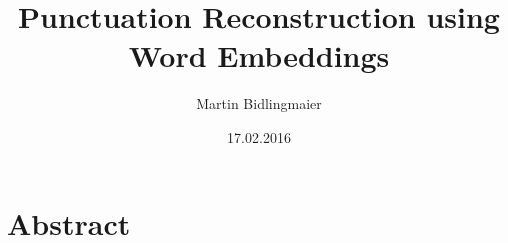 \documentclass{amsart}
\theoremstyle{plain}
\theoremstyle{definition}
\begin{document}
\title{Punctuation Reconstruction using Word Embeddings}
\author{Martin Bidlingmaier}
\date{17.02.2016}
\maketitle

\section{Abstract}

\printbibliography
\end{document}
